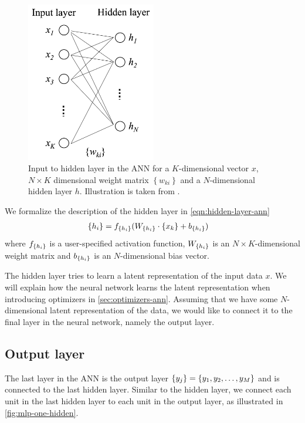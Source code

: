 \begin{figure}[H]
    \centering
    \includegraphics[height=7cm]{thesis/figures/ann-input-hidden-layer-rong-2014.png}
    \caption{Input to hidden layer in the ANN for a $K$-dimensional vector $x$, $N\times K$ dimensional weight matrix $\left\{ w_{ki} \right\}$ and a $N$-dimensional hidden layer $h$. Illustration is taken from \cite[Figure 6]{rong2016word2vec}.}
    \label{fig:hidden_layer_ann}
\end{figure}

We formalize the description of the hidden layer in \cref{eqn:hidden-layer-ann}
\begin{align}
    \label{eqn:hidden-layer-ann}
    \left\{ {h}_{i} \right\} &= f_{\left\{ {h}_{i} \right\}}(W_{\left\{ {h}_{i} \right\}} \cdot \left\{ {x}_{k} \right\} + b_{\left\{ {h}_{i} \right\}})
\end{align}
where $f_{\left\{ {h}_{i} \right\}}$ is a user-specified activation function, $W_{\left\{ {h}_{i} \right\}}$ is an $N \times K$-dimensional weight matrix and $b_{\left\{ {h}_{i} \right\}}$ is an $N$-dimensional bias vector.

The hidden layer tries to learn a latent representation of the input data $x$. We will explain how the neural network learns the latent representation when introducing optimizers in \cref{sec:optimizers-ann}. Assuming that we have some $N$-dimensional latent representation of the data, we would like to connect it to the final layer in the neural network, namely the output layer.

\subsection{Output layer}
The last layer in the ANN is the output layer $\left\{ {y}_{j} \right\} = \left\{ y_1, y_2, \ldots, y_M \right\}$ and is connected to the last hidden layer. Similar to the hidden layer, we connect each unit in the last hidden layer to each unit in the output layer, as illustrated in \cref{fig:mlp-one-hidden}.

